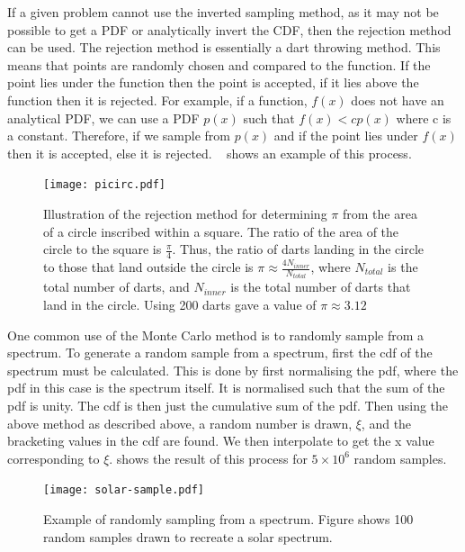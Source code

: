 If a given problem cannot use the inverted sampling method, as it may not be possible to get a PDF or analytically invert the CDF, then the rejection method can be used.
The rejection method is essentially a dart throwing method.
This means that points are randomly chosen and compared to the function.
If the point lies under the function then the point is accepted, if it lies above the function then it is rejected.
For example, if a function, $f(x)$ does not have an analytical PDF, we can use a PDF $p(x)$ such that $f(x) < cp(x)$ where c is a constant.
Therefore, if we sample from $p(x)$ and if the point lies under $f(x)$ then it is accepted, else it is rejected.
~ shows an example of this process.
\begin{figure}[!htbp]
    \centering
    \texttt{[image: picirc.pdf]}
    \caption{Illustration of the rejection method for determining $\pi$ from the area of a circle inscribed within a square. The ratio of the area of the circle to the square is $\tfrac{\pi}{4}$. Thus, the ratio of darts landing in the circle to those that land outside the circle is $\pi \approx \tfrac{4N_{inner}}{N_{total}}$, where $N_{total}$ is the total number of darts, and $N_{inner}$ is the total number of darts that land in the circle. Using 200 darts gave a value of $\pi \approx 3.12$}
    \label{fig:picircle}
\end{figure}

\FloatBarrier
One common use of the Monte Carlo method is to randomly sample from a spectrum.
To generate a random sample from a spectrum, first the \gls*{cdf} of the spectrum must be calculated.
This is done by first normalising the \gls*{pdf}, where the \gls*{pdf} in this case is the spectrum itself.
It is normalised such that the sum of the \gls*{pdf} is unity.
The \gls*{cdf} is then just the cumulative sum of the \gls*{pdf}.
Then using the above method as described above, a random number is drawn, $\xi$, and the bracketing values in the \gls*{cdf} are found.
We then interpolate to get the x value corresponding to $\xi$.
 shows the result of this process for $5\times10^6$ random samples.

\begin{figure}[!htbp]
    \centering
    \texttt{[image: solar-sample.pdf]}
    \caption{Example of randomly sampling from a spectrum. Figure shows 100 random samples drawn to recreate a solar spectrum.}
    \label{fig:solar}
\end{figure}


